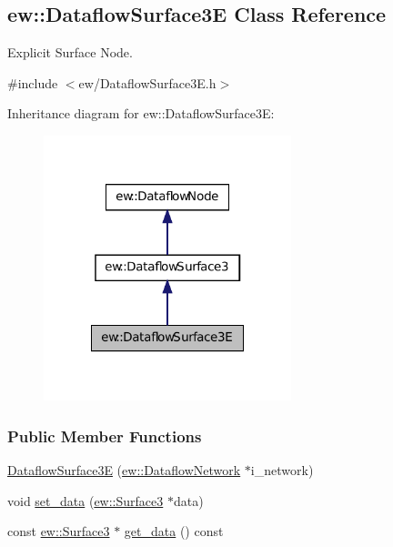 \hypertarget{classew_1_1DataflowSurface3E}{
\subsection{ew::DataflowSurface3E Class Reference}
\label{classew_1_1DataflowSurface3E}
}


Explicit Surface Node.  




{\ttfamily \#include $<$ew/DataflowSurface3E.h$>$}



Inheritance diagram for ew::DataflowSurface3E:
\nopagebreak
\begin{figure}[H]
\begin{center}
\leavevmode
\includegraphics[width=204pt]{classew_1_1DataflowSurface3E__inherit__graph}
\end{center}
\end{figure}
\subsubsection*{Public Member Functions}
\begin{DoxyCompactItemize}
\item 
\hyperlink{classew_1_1DataflowSurface3E_ad4ab434027e31e3cf158c49f3eb15cd4}{DataflowSurface3E} (\hyperlink{classew_1_1DataflowNetwork}{ew::DataflowNetwork} $\ast$i\_\-network)
\item 
void \hyperlink{classew_1_1DataflowSurface3E_ae7cb9800ff79805c0249cb531a80f9f7}{set\_\-data} (\hyperlink{classew_1_1Surface3}{ew::Surface3} $\ast$data)
\item 
const \hyperlink{classew_1_1Surface3}{ew::Surface3} $\ast$ \hyperlink{classew_1_1DataflowSurface3E_a3d77b1d0cd97a05e4173eeb08a1f4994}{get\_\-data} () const 
\end{DoxyCompactItemize}



